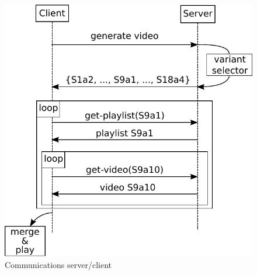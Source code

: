 \documentclass{sig-alternate}
\newcommand\ma[1]{\todo[color=green!40,inline]{TODO (Mathieu): #1}}
\newcommand\ma[1]{}
\begin{document}
\begin{figure}
\centering
\includegraphics[width=\getVal{cserver_size}\linewidth]{figures/server-client.pdf}
\vspace*{-2mm}
\caption{\label{fig:process}Communications server/client}
\vspace*{-4mm}
\end{figure}





%
\end{document}
